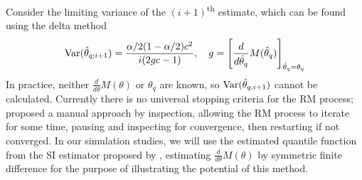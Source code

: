 Consider the limiting variance of the $(i+1)$\textsuperscript{th} estimate, which can be found using the delta method \cite{Garthwaite1992}
\[
    \mathrm{Var}(\hat\theta_{q; i+1}) = \frac{\alpha/2 (1-\alpha/2) c^2}{i(2gc-1)}, \quad g = \left[ \frac{d}{d\hat\theta_q}M(\hat\theta_q) \right]_{\hat\theta_q = \theta_q}
\]
In practice, neither $\frac{d}{d\theta}M(\theta)$ or $\theta_q$ are known, so $\mathrm{Var}(\hat\theta_{q; i+1})$ cannot be calculated. Currently there is no universal stopping criteria for the RM process; \citet{Garthwaite1992} proposed a manual approach by inspection, allowing the RM process to iterate for some time, pausing and inspecting for convergence, then restarting if not converged. In our simulation studies, we will use the estimated quantile function from the SI estimator proposed by \citet{Huang2019}, estimating $\frac{d}{d\theta}M(\theta)$ by symmetric finite difference \cite{Fu2015} for the purpose of illustrating the potential of this method.